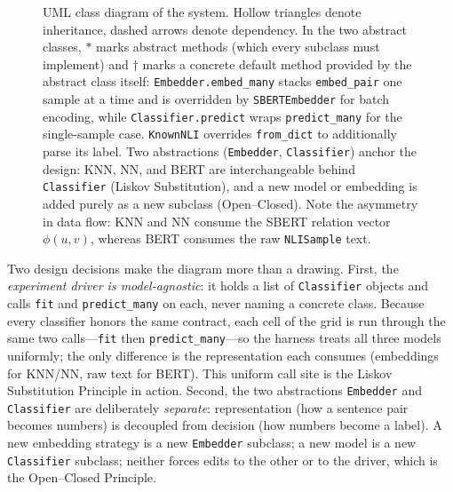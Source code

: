 \documentclass[conference]{IEEEtran}
\begin{document}
\begin{figure}[t]
\caption{UML class diagram of the system. Hollow triangles denote
inheritance, dashed arrows denote dependency. In the two abstract
classes, $*$ marks abstract methods (which every subclass must
implement) and $\dagger$ marks a concrete default method provided by the
abstract class itself: \texttt{Embedder.embed\_many} stacks
\texttt{embed\_pair} one sample at a time and is overridden by
\texttt{SBERTEmbedder} for batch encoding, while
\texttt{Classifier.predict} wraps \texttt{predict\_many} for the
single-sample case. \texttt{KnownNLI} overrides \texttt{from\_dict} to
additionally parse its label. Two abstractions
(\texttt{Embedder}, \texttt{Classifier}) anchor the design: KNN, NN, and
BERT are interchangeable behind \texttt{Classifier} (Liskov
Substitution), and a new model or embedding is added purely as a new
subclass (Open--Closed). Note the asymmetry in data flow: KNN and NN
consume the SBERT relation vector $\phi(u,v)$, whereas BERT consumes the
raw \texttt{NLISample} text.}
\label{fig:uml}
\end{figure}

Two design decisions make the diagram more than a drawing. First, the
\emph{experiment driver is model-agnostic}: it holds a list of
\texttt{Classifier} objects and calls \texttt{fit} and
\texttt{predict\_many} on each, never naming a concrete class. Because
every classifier honors the same contract, each cell of the grid is run
through the same two calls---\texttt{fit} then \texttt{predict\_many}---so
the harness treats all three models uniformly; the only difference is the
representation each consumes (embeddings for KNN/NN, raw text for BERT).
This uniform call site is the Liskov Substitution Principle in action.
Second, the two abstractions
\texttt{Embedder} and \texttt{Classifier} are deliberately
\emph{separate}: representation (how a sentence pair becomes numbers) is
decoupled from decision (how numbers become a label). A new embedding
strategy is a new \texttt{Embedder} subclass; a new model is a new
\texttt{Classifier} subclass; neither forces edits to the other or to
the driver, which is the Open--Closed Principle.
\end{document}
